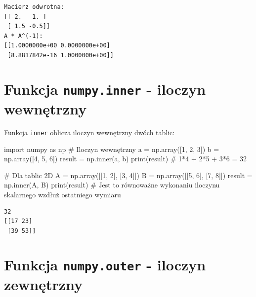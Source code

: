 \documentclass[
  letterpaper,
  DIV=11,
  numbers=noendperiod]{scrreprt}
\newenvironment{Shaded}{\begin{snugshade}}{\end{snugshade}}
\newcommand{\BuiltInTok}[1]{\textcolor[rgb]{0.00,0.23,0.31}{#1}}
\newcommand{\CommentTok}[1]{\textcolor[rgb]{0.37,0.37,0.37}{#1}}
\newcommand{\DecValTok}[1]{\textcolor[rgb]{0.68,0.00,0.00}{#1}}
\newcommand{\ImportTok}[1]{\textcolor[rgb]{0.00,0.46,0.62}{#1}}
\newcommand{\NormalTok}[1]{\textcolor[rgb]{0.00,0.23,0.31}{#1}}
\newcommand{\OperatorTok}[1]{\textcolor[rgb]{0.37,0.37,0.37}{#1}}
\begin{document}
\begin{verbatim}
Macierz odwrotna:
[[-2.   1. ]
 [ 1.5 -0.5]]
A * A^(-1):
[[1.0000000e+00 0.0000000e+00]
 [8.8817842e-16 1.0000000e+00]]
\end{verbatim}

\section{\texorpdfstring{Funkcja \texttt{numpy.inner} - iloczyn
wewnętrzny}{Funkcja numpy.inner - iloczyn wewnętrzny}}\label{funkcja-numpy.inner---iloczyn-wewnux119trzny}

Funkcja \texttt{inner} oblicza iloczyn wewnętrzny dwóch tablic:

\begin{Shaded}
\begin{Highlighting}[]
\ImportTok{import}\NormalTok{ numpy }\ImportTok{as}\NormalTok{ np}
\CommentTok{\# Iloczyn wewnętrzny}
\NormalTok{a }\OperatorTok{=}\NormalTok{ np.array([}\DecValTok{1}\NormalTok{, }\DecValTok{2}\NormalTok{, }\DecValTok{3}\NormalTok{])}
\NormalTok{b }\OperatorTok{=}\NormalTok{ np.array([}\DecValTok{4}\NormalTok{, }\DecValTok{5}\NormalTok{, }\DecValTok{6}\NormalTok{])}
\NormalTok{result }\OperatorTok{=}\NormalTok{ np.inner(a, b)}
\BuiltInTok{print}\NormalTok{(result)  }\CommentTok{\# 1*4 + 2*5 + 3*6 = 32}

\CommentTok{\# Dla tablic 2D}
\NormalTok{A }\OperatorTok{=}\NormalTok{ np.array([[}\DecValTok{1}\NormalTok{, }\DecValTok{2}\NormalTok{], [}\DecValTok{3}\NormalTok{, }\DecValTok{4}\NormalTok{]])}
\NormalTok{B }\OperatorTok{=}\NormalTok{ np.array([[}\DecValTok{5}\NormalTok{, }\DecValTok{6}\NormalTok{], [}\DecValTok{7}\NormalTok{, }\DecValTok{8}\NormalTok{]])}
\NormalTok{result }\OperatorTok{=}\NormalTok{ np.inner(A, B)}
\BuiltInTok{print}\NormalTok{(result)}
\CommentTok{\# Jest to równoważne wykonaniu iloczynu skalarnego wzdłuż ostatniego wymiaru}
\end{Highlighting}
\end{Shaded}

\begin{verbatim}
32
[[17 23]
 [39 53]]
\end{verbatim}

\section{\texorpdfstring{Funkcja \texttt{numpy.outer} - iloczyn
zewnętrzny}{Funkcja numpy.outer - iloczyn zewnętrzny}}\label{funkcja-numpy.outer---iloczyn-zewnux119trzny}
\end{document}
